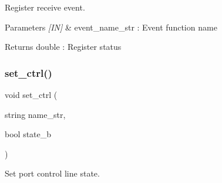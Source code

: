 Register receive event. 


\begin{DoxyCode}{0}
\DoxyCodeLine{\{}
\DoxyCodeLine{    \textcolor{comment}{// Check if data event}}
\DoxyCodeLine{    \{}
\DoxyCodeLine{        \{}
\DoxyCodeLine{            \textcolor{comment}{// Process data}}
\DoxyCodeLine{        \}}
\DoxyCodeLine{    \}}
\DoxyCodeLine{\}}
\end{DoxyCode}



\begin{DoxyParams}{Parameters}
{\em \mbox{[}\+I\+N\mbox{]}} & event\+\_\+name\+\_\+str \+: Event function name \\
\hline
\end{DoxyParams}
\begin{DoxyReturn}{Returns}
double \+: Register status 
\end{DoxyReturn}
\mbox{\label{classuart_a00cc786dbdcb7eaa0ea83423ce1cc581}} 
\subsubsection{set\_ctrl()}
{\footnotesize\ttfamily void set\+\_\+ctrl (\begin{DoxyParamCaption}\item[{string}]{name\+\_\+str,  }\item[{bool}]{state\+\_\+b }\end{DoxyParamCaption})}



Set port control line state. 


\begin{DoxyCode}{0}
\end{DoxyCode}



